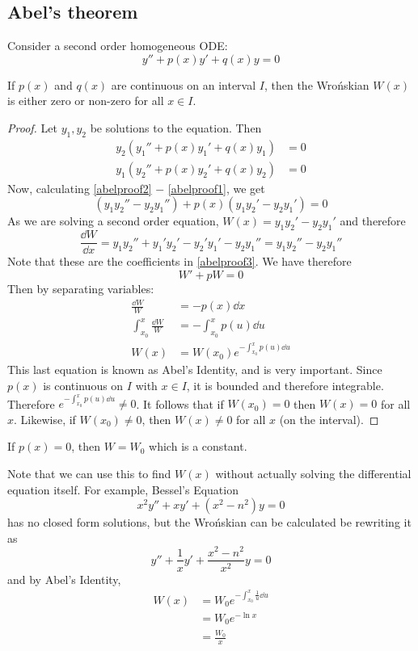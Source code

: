 \subsection{Abel's theorem}
Consider a second order homogeneous ODE:\@
\[
	y'' + p(x)y' + q(x)y = 0
\]
\begin{theorem}
	If \(p(x)\) and \(q(x)\) are continuous on an interval \(I\), then the Wro\'nskian \(W(x)\) is either zero or non-zero for all \(x \in I\).
\end{theorem}
\begin{proof}
	Let \(y_1, y_2\) be solutions to the equation.
	Then
	\begin{align}
		\label{abelproof1} y_2(y_1'' + p(x)y_1' + q(x)y_1) & = 0 \\
		\label{abelproof2} y_1(y_2'' + p(x)y_2' + q(x)y_2) & = 0
	\end{align}
	Now, calculating \eqref{abelproof2} \(-\) \eqref{abelproof1}, we get
	\begin{equation}\label{abelproof3}
		(y_1y_2'' - y_2y_1'') + p(x)(y_1y_2' - y_2y_1') = 0
	\end{equation}
	As we are solving a second order equation, \(W(x) = y_1y_2' - y_2y_1'\) and therefore
	\[
		\frac{\dd{W}}{\dd{x}} = y_1y_2'' + y_1'y_2' - y_2'y_1' - y_2y_1'' = y_1y_2'' - y_2y_1''
	\]
	Note that these are the coefficients in \eqref{abelproof3}.
	We have therefore
	\begin{equation}\label{abelproof4}
		W' + pW = 0
	\end{equation}
	Then by separating variables:
	\begin{align*}
		\frac{\dd{W}}{W}              & = -p(x)\dd{x}                         \\
		\int_{x_0}^x \frac{\dd{W}}{W} & = -\int_{x_0}^x p(u)\dd{u}            \\
		W(x)                          & = W(x_0)e^{-\int_{x_0}^x p(u) \dd{u}}
	\end{align*}
	This last equation is known as Abel's Identity, and is very important.
	Since \(p(x)\) is continuous on \(I\) with \(x \in I\), it is bounded and therefore integrable.
	Therefore \(e^{-\int_{x_0}^x p(u) \dd{u}} \neq 0\).
	It follows that if \(W(x_0) = 0\) then \(W(x) = 0\) for all \(x\).
	Likewise, if \(W(x_0) \neq 0\), then \(W(x) \neq 0\) for all \(x\) (on the interval).
\end{proof}
\begin{corollary}
	If \(p(x) = 0\), then \(W = W_0\) which is a constant.
\end{corollary}
Note that we can use this to find \(W(x)\) without actually solving the differential equation itself.
For example, Bessel's Equation
\[
	x^2y'' + xy' + (x^2 - n^2)y = 0
\]
has no closed form solutions, but the Wro\'nskian can be calculated be rewriting it as
\[
	y'' + \frac{1}{x}y' + \frac{x^2-n^2}{x^2}y = 0
\]
and by Abel's Identity,
\begin{align*}
	W(x) & = W_0 e^{-\int_{x_0}^x \frac{1}{u} \dd{u}} \\
	     & = W_0 e^{-\ln x}                           \\
	     & = \frac{W_0}{x}
\end{align*}

